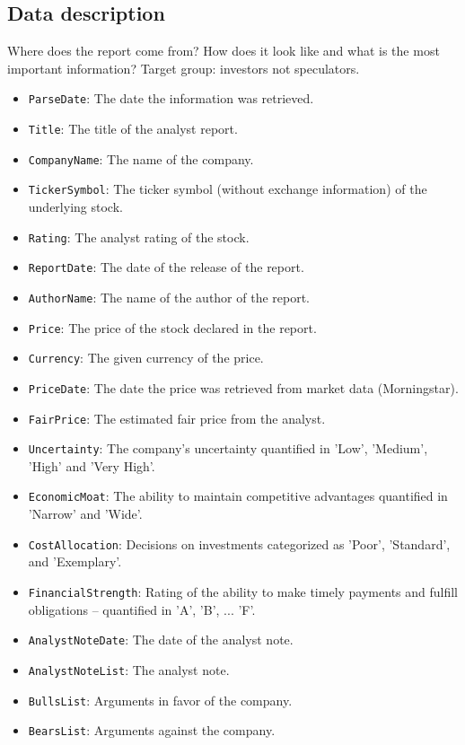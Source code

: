 \documentclass[conference]{IEEEtran}
\begin{document}
\subsection{Data description}%
Where does the report come from? How does it look like and what is the most important information?
Target group: investors not speculators.
\begin{itemize}    
    \item \texttt{ParseDate}: The date the information was retrieved.
  \item \texttt{Title}: The title of the analyst report.
  \item \texttt{CompanyName}: The name of the company. 
  \item \texttt{TickerSymbol}: The ticker symbol (without exchange information) of the underlying stock.
  \item \texttt{Rating}: The analyst rating of the stock.
  \item \texttt{ReportDate}: The date of the release of the report. 
  \item \texttt{AuthorName}: The name of the author of the report. 
  \item \texttt{Price}: The price of the stock declared in the report.
  \item \texttt{Currency}: The given currency of the price. 
  \item \texttt{PriceDate}: The date the price was retrieved from market data (Morningstar).
  \item \texttt{FairPrice}: The estimated fair price from the analyst.
  \item \texttt{Uncertainty}: The company's uncertainty quantified in 'Low', 'Medium', 'High' and 'Very High'.
  \item \texttt{EconomicMoat}: The ability to maintain competitive advantages quantified in 'Narrow' and 'Wide'.
  \item \texttt{CostAllocation}:  Decisions on investments categorized as 'Poor', 'Standard', and 'Exemplary'.
  \item \texttt{FinancialStrength}: Rating of the ability to make timely payments and fulfill obligations -- quantified in 'A', 'B', ... 'F'.
  \item \texttt{AnalystNoteDate}: The date of the analyst note.
  \item \texttt{AnalystNoteList}: The analyst note.
  \item \texttt{BullsList}: Arguments in favor of the company.
  \item \texttt{BearsList}: Arguments against the company.

\end{itemize}
\end{document}
